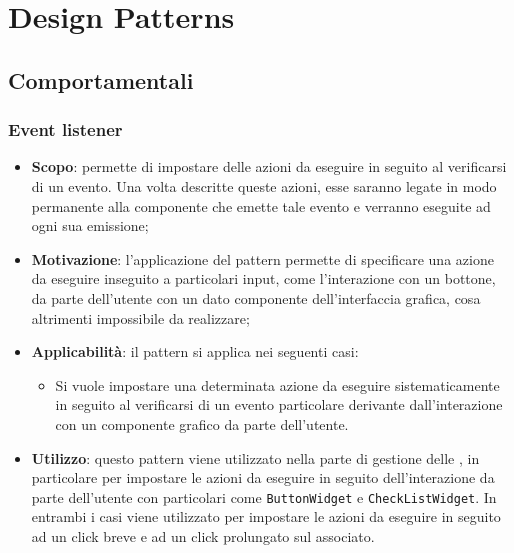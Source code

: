 \section{Design Patterns}

\subsection{Comportamentali}
\subsubsection{Event listener}
\begin{itemize}
	\item \textbf{Scopo}: permette di impostare delle azioni da eseguire in seguito al verificarsi di un evento. Una volta descritte queste azioni, esse saranno legate in modo permanente alla componente che emette tale evento e verranno eseguite ad ogni sua emissione;
	\item \textbf{Motivazione}: l'applicazione del pattern  permette di specificare una azione da eseguire inseguito a particolari input, come l'interazione con un bottone, da parte dell'utente con un dato componente dell'interfaccia grafica, cosa altrimenti impossibile da realizzare;
	\item \textbf{Applicabilità}: il pattern  si applica nei seguenti casi:
		  \begin{itemize}
		  		\item Si vuole impostare una determinata azione da eseguire sistematicamente in seguito al verificarsi di un evento particolare derivante dall'interazione con un componente grafico da parte dell'utente.
		  \end{itemize}
	\item \textbf{Utilizzo}: questo pattern viene utilizzato nella parte di gestione delle , in particolare per impostare le azioni da eseguire in seguito dell'interazione da parte dell'utente con particolari  come \texttt{ButtonWidget} e \texttt{CheckListWidget}. In entrambi i casi viene utilizzato per impostare le azioni da eseguire in seguito ad un click breve e ad un click prolungato sul  associato.
\end{itemize}

